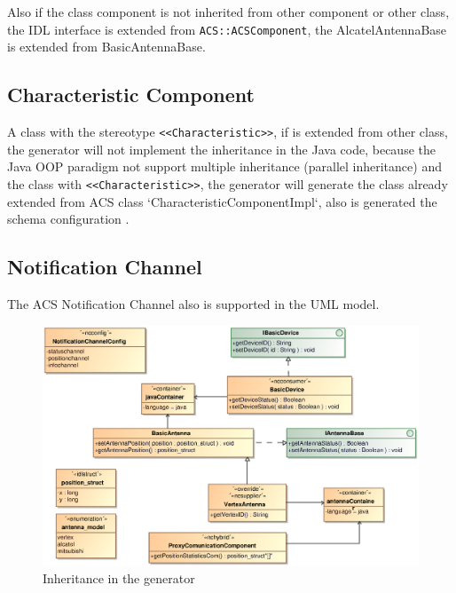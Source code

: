 Also if the class component is not inherited from other component or other
class, the IDL interface is extended from \verb+ACS::ACSComponent+, the
AlcatelAntennaBase is extended from BasicAntennaBase.

\subsection{Characteristic Component}
A class with the stereotype \verb+<<Characteristic>>+, if is extended from
other class, the generator will not implement the inheritance in the Java code,
because the Java OOP paradigm not support multiple inheritance (parallel
inheritance) and the class with \verb+<<Characteristic>>+, the generator will
generate the class already extended from ACS class
`CharacteristicComponentImpl`, also is generated the schema configuration .

\subsection{Notification Channel} 
 
 The ACS Notification Channel also is supported in the UML model.
 
 \begin{figure}[h!t]
\begin{center}
\includegraphics[scale=0.88]{images/example6}
\caption{\label{fig:vs_diag}Inheritance in the generator}
\end{center}
\end{figure}
 
